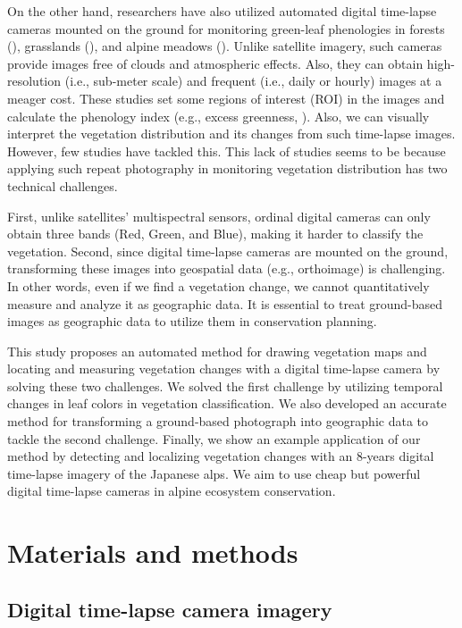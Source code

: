 \documentclass{article}
\begin{document}
On the other hand, researchers have also utilized automated digital time-lapse cameras mounted on the ground for monitoring green-leaf phenologies in forests (\cite{Richardson2009EcolAppl}), grasslands (\cite{Browning2017RemSen}), and alpine meadows (\cite{IdeOguma2013EcolInfom}). Unlike satellite imagery, such cameras provide images free of clouds and atmospheric effects. Also, they can obtain high-resolution (i.e., sub-meter scale) and frequent (i.e., daily or hourly) images at a meager cost. These studies set some regions of interest (ROI) in the images and calculate the phenology index (e.g., excess greenness, \cite{Woebbecke1995ASAE}). Also, we can visually interpret the vegetation distribution and its changes from such time-lapse images. However, few studies have tackled this. This lack of studies seems to be because applying such repeat photography in monitoring vegetation distribution has two technical challenges.

First, unlike satellites' multispectral sensors, ordinal digital cameras can only obtain three bands (Red, Green, and Blue), making it harder to classify the vegetation. Second, since digital time-lapse cameras are mounted on the ground, transforming these images into geospatial data (e.g., orthoimage) is challenging. In other words, even if we find a vegetation change, we cannot quantitatively measure and analyze it as geographic data. It is essential to treat ground-based images as geographic data to utilize them in conservation planning.

This study proposes an automated method for drawing vegetation maps and locating and measuring vegetation changes with a digital time-lapse camera by solving these two challenges. We solved the first challenge by utilizing temporal changes in leaf colors in vegetation classification. We also developed an accurate method for transforming a ground-based photograph into geographic data to tackle the second challenge. Finally, we show an example application of our method by detecting and localizing vegetation changes with an 8-years digital time-lapse imagery of the Japanese alps. We aim to use cheap but powerful digital time-lapse cameras in alpine ecosystem conservation.

\hypertarget{materials-and-methods}{%
\section{Materials and methods}\label{materials-and-methods}}

\hypertarget{digital-time-lapse-camera-imagery}{%
\subsection{Digital time-lapse camera imagery}\label{digital-time-lapse-camera-imagery}}
\end{document}
